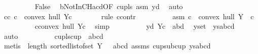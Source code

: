 \begin{isabellebody}
\ \ \ \ \ \ \ \ \isamarkupfalse%
\ False\ \isamarkupfalse%
\ bNotInCHacd{\isacharbrackleft}{\kern0pt}OF\ cup{\isacharunderscore}{\kern0pt}ls{\isacharbrackright}{\kern0pt}\ asm\ y{\isacharunderscore}{\kern0pt}d\ \isamarkupfalse%
\ auto\isanewline
\ \ \ \ \ \ \isamarkupfalse%
\isanewline
\ \ \ \ \ \ \isamarkupfalse%
\ cc{\isacharcolon}{\kern0pt}{\isachardoublequoteopen}{\isasymnot}\ c\ {\isasymin}\ convex\ hull\ {\isacharparenleft}{\kern0pt}Y{\isacharminus}{\kern0pt}{\isacharbraceleft}{\kern0pt}c{\isacharbraceright}{\kern0pt}{\isacharparenright}{\kern0pt}{\isachardoublequoteclose}\ \isanewline
\ \ \ \ \ \ \isamarkupfalse%
{\isacharparenleft}{\kern0pt}rule\ ccontr{\isacharparenright}{\kern0pt}\isanewline
\ \ \ \ \ \ \ \ \isamarkupfalse%
\ asm{\isacharcolon}{\kern0pt}{\isachardoublequoteopen}{\isasymnot}\ c\ {\isasymnotin}\ convex\ hull\ {\isacharparenleft}{\kern0pt}Y\ {\isacharminus}{\kern0pt}\ {\isacharbraceleft}{\kern0pt}c{\isacharbraceright}{\kern0pt}{\isacharparenright}{\kern0pt}{\isachardoublequoteclose}\isanewline
\ \ \ \ \ \ \ \ \isamarkupfalse%
\ {\isachardoublequoteopen}c{\isasymin}convex\ hull\ {\isacharparenleft}{\kern0pt}Y{\isacharminus}{\kern0pt}{\isacharbraceleft}{\kern0pt}c{\isacharbraceright}{\kern0pt}{\isacharparenright}{\kern0pt}{\isachardoublequoteclose}\ \isamarkupfalse%
\ simp\isanewline
\ \ \ \ \ \ \ \ \isamarkupfalse%
\ y{\isacharunderscore}{\kern0pt}d{\isacharcolon}{\kern0pt}\ {\isachardoublequoteopen}Y{\isacharminus}{\kern0pt}{\isacharbraceleft}{\kern0pt}c{\isacharbraceright}{\kern0pt}\ {\isacharequal}{\kern0pt}\ {\isacharbraceleft}{\kern0pt}a{\isacharcomma}{\kern0pt}b{\isacharcomma}{\kern0pt}d{\isacharbraceright}{\kern0pt}{\isachardoublequoteclose}\ \isamarkupfalse%
\ y{\isacharunderscore}{\kern0pt}set\ {\isachardoublequoteopen}{}{}{\isachardoublequoteclose}\ ys{\isacharunderscore}{\kern0pt}abcd\ \isamarkupfalse%
\ auto\isanewline
\ \ \ \ \ \ \ \ \isamarkupfalse%
\ cup{\isacharunderscore}{\kern0pt}ls{\isacharcolon}{\kern0pt}{\isachardoublequoteopen}cup\ {}\ {\isacharbrackleft}{\kern0pt}a{\isacharcomma}{\kern0pt}b{\isacharcomma}{\kern0pt}c{\isacharcomma}{\kern0pt}d{\isacharbrackright}{\kern0pt}{\isachardoublequoteclose}\ \isanewline
\ \ \ \ \ \ \ \ \ \ \isamarkupfalse%
\ {\isacharparenleft}{\kern0pt}metis\ {\isachardoublequoteopen}{}{\isachardoublequoteclose}\ {\isacartoucheopen}length\ {\isacharparenleft}{\kern0pt}sorted{\isacharunderscore}{\kern0pt}list{\isacharunderscore}{\kern0pt}of{\isacharunderscore}{\kern0pt}set\ Y{\isacharparenright}{\kern0pt}\ {\isacharequal}{\kern0pt}\ {}{\isacartoucheclose}\ abcd\ assms\ cup{\isacharunderscore}{\kern0pt}sub{\isacharunderscore}{\kern0pt}cup\ ys{\isacharunderscore}{\kern0pt}abcd{\isacharparenright}{\kern0pt}\isanewline

\end{isabellebody}

